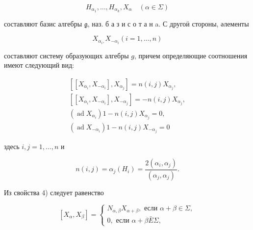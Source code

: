 \documentclass[10pt]{article}
\begin{document}
\[

H_{\alpha_{1}}, \ldots, H_{\alpha_{k}}, X_{\alpha} \quad(\alpha \in \Sigma)

\]



составляют базис алгебры $\mathfrak{g}$, наз. б а з и с о т а н a. С другоӥ стороны, әлементы



\[

X_{\alpha_{i},} X_{-\alpha_{i}}(i=1, \ldots, n)

\]



составляют систему образующих алгебры $g$, причем определяющие соотношения имеют следующий вид:



\[

\begin{gathered}

{\left[\left[X_{\alpha_{i}}, X_{-\alpha_{i}}\right], X_{\alpha_{j}}\right]=n(i, j) X_{\alpha_{j}},} \\

{\left[\left[X_{\alpha_{i}}, X_{-\alpha_{i}}\right], X_{-\alpha_{j}}\right]=-n(i, j) X_{\alpha_{j}},} \\

\left(\operatorname{ad} X_{\alpha_{i}}\right) 1-n(i, j) X_{\alpha_{j}}=0, \\

\left(\operatorname{ad} X_{-\alpha_{i}}\right) 1-n(i, j) X_{-\alpha_{j}}=0

\end{gathered}

\]



здесь $i, j=1, \ldots, n$ и



\[

n(i, j)=\alpha_{j}\left(H_{i}\right)=\frac{2\left(\alpha_{i}, \alpha_{j}\right)}{\left(\alpha_{j}, \alpha_{j}\right)} .

\]



Из свойства 4) следует равенство



\[

\left[X_{\alpha}, X_{\beta}\right]=\left\{\begin{array}{c}

N_{\alpha, \beta} X_{\alpha+\beta}, \text { если } \alpha+\beta \in \Sigma, \\

0, \text { если } \alpha+\beta \bar{E} \Sigma,

\end{array}\right.

\]
\end{document}
